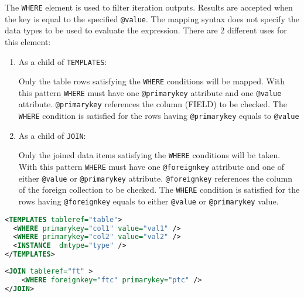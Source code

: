 The \texttt{WHERE} element is used to filter iteration outputs. Results are accepted when the key is equal to the specified \texttt{@value}. The mapping syntax does not specify the data types to be used to evaluate the expression. 
There  are 2 different uses for this element:
\begin{enumerate}
\item{As a child of \texttt{TEMPLATES}:}

  Only the table rows satisfying the \texttt{WHERE} conditions will be mapped. 
  With this pattern \texttt{WHERE} must have one \texttt{@primarykey} attribute and one \texttt{@value} attribute. 
  \texttt{@primarykey} references the column (FIELD) to be checked. 
  The \texttt{WHERE} condition is satisfied for the rows having \texttt{@primarykey} equals to \texttt{@value}
             
\item{As a child of \texttt{JOIN}:}
      
  Only the joined data items satisfying the \texttt{WHERE} conditions will be taken. 
  With this pattern \texttt{WHERE} must have one \texttt{@foreignkey} attribute and one of either \texttt{@value} or \texttt{@primarykey} attribute. 
  \texttt{@foreignkey} references the column of the foreign collection to be checked. 
  The \texttt{WHERE} condition is satisfied for the rows having \texttt{@foreignkey} equals to either \texttt{@value} or \texttt{@primarykey} value.

\end{enumerate}

\begin{lstlisting}[caption={\texttt{WHERE} Example: only rows having val1 as col1 value and  val2 as col2 value are mapped},language=XML]
<TEMPLATES tableref="table">
  <WHERE primarykey="col1" value="val1" />
  <WHERE primarykey="col2" value="val2" />
  <INSTANCE  dmtype="type" />
</TEMPLATES>
\end{lstlisting}

\begin{lstlisting}[caption={\texttt{WHERE} Example: the join is satisfied when the value of the ptc column is equal to the ftc column of the foreign table. },language=XML]
<JOIN tableref="ft" >
	<WHERE foreignkey="ftc" primarykey="ptc" />
</JOIN>
\end{lstlisting}


